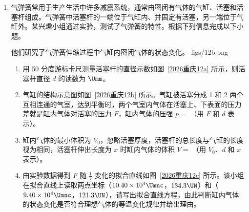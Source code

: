\documentclass[\gkver]{gaokaozhenti}
\begin{document}
\begin{enumerate}
{\begin{enumerate}
	\item
	$3.86 \UJ$
\end{enumerate}
}
\item
气弹簧常用于生产生活中许多减震系统，通常由密闭有气体的气缸、活塞和活塞杆组成。气弹簧中活塞杆的一端位于气缸内、并固定有活塞，另一端位于气缸外。某兴趣小组通过实验，测试了气弹簧的特性。根据下列信息完成以下小题。

他们研究了气弹簧伸缩过程中气缸内密闭气体的状态变化。
{figs/12b.png}
\begin{enumerate}
	\item
	用 50 分度游标卡尺测量活塞杆的直径示数如图~\ref{2026重庆12a} 所示，则活塞杆直径 $d$ 的读数为  $\Umm$。
	\item
	气缸的结构示意图如图~\ref{2026重庆12b} 所示。气缸被活塞分成 1 和 2 两个互相连通的气室，达到平衡时，两个气室内气体在活塞上、下表面的压力差就是缸内气体对活塞的压力 $F$，缸内气体的压强 $p=$ （用 $F$ 和 $d$ 表示）。
	\item
	缸内气体的最小体积为 $V_{0}$，忽略活塞厚度，活塞杆的总长度与气缸的长度视为相同，活塞杆伸出长度为 $x$ 时缸内气体的体积 $V=$ （用 $V_{0}$、$d$ 和 $x$ 表示）。
	\item
	由实验数据得到 $F$ 随 $\frac{1}{V}$ 变化的拟合直线如图~\ref{2026重庆12c} 所示。该小组在拟合直线上读取两点坐标（$10.40\times10^{4} \Umnc$，$134.3 \UN$）和（$9.40\times10^{4} \Umnc$，$121.3 \UN$），请写出拟合直线方程，由此判断缸内气体的状态变化是否符合理想气体的等温变化规律并给出理由。
\end{enumerate}
\onepicture[num=3, label=2026重庆12c, w=12.97cm]{}


\end{enumerate}
\end{document}
